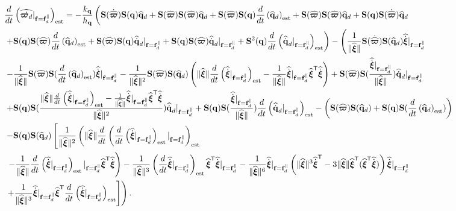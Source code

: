 \documentclass[journal,onecolumn]{IEEEtran}
\begin{document}
	\begin{align}
		&\frac{d}{dt}\LP\widehat{\dot{\bs{\varpi}_d}}|_{\f=\fd^{\|}}\RP_{\text{est}}=-\frac{k_{\dir}}{h_{\dir}}\left(\Skew{\dot{\widehat{\bs{\varpi}}}}\Skew{\dir}\qdhat+\Skew{\widehat{\bs{\varpi}}}\Skew{\widehat{\bs{\varpi}}}\qdhat+\Skew{\widehat{\bs{\varpi}}}\Skew{\dir}	\frac{d}{dt}\LP\qdhat\RP_{\text{est}}+\Skew{\widehat{\bs{\varpi}}}\Skew{\widehat{\bs{\varpi}}}\qdhat+\Skew{\dir}\Skew{\dot{\widehat{\bs{\varpi}}}}\qdhat\right.\nonumber\\
		&\left.+\Skew{\dir}\Skew{\widehat{\bs{\varpi}}}\frac{d}{dt}\LP\qdhat\RP_{\text{est}}+\Skew{\widehat{\bs{\varpi}}}\Skew{\dir}\qddothat|_{\f=\f_d^{\|}}+\Skew{\dir}\Skew{\widehat{\bs{\varpi}}}\qddothat|_{\f=\f_d^{\|}}+\Skew[2]{\dir}\frac{d}{dt}\LP\qddothat|_{\f=\f_d^{\|}}\RP_{\text{est}}\right) 
		-\left(\frac{1}{\|\widehat{\Xiq}\|}\Skew{\dot{\widehat{\bs{\varpi}}}}\Skew{\qdhat}\widehat{\dot{\Xiq}}|_{\f=\fd^{\|}}\right.\nonumber\\
		&\left.-\frac{1}{\|\widehat{\Xiq}\|}\Skew{\widehat{\bs{\varpi}}}\Skew{\frac{d}{dt}\LP\qdhat\RP_{\text{est}}}\widehat{\dot{\Xiq}}|_{\f=\fd^{\|}} - \frac{1}{\|\widehat{\Xiq}\|^2}\Skew{\widehat{\bs{\varpi}}}\Skew{\qdhat}\LP\|\widehat{\Xiq}\|\frac{d}{dt}\LP\widehat{\dot{\Xiq}}|_{\f=\fd^{\|}}\RP_{\text{est}}-\frac{1}{\|\widehat{\Xiq}\|}\widehat{\dot{\Xiq}}|_{\f=\fd^{\|}}\widehat{\Xiq}\trs\widehat{\dot{\Xiq}}\RP+\Skew{\widehat{\bs{\varpi}}}\Skew{\frac{\widehat{\dot{\Xiq}}|_{\f=\fd^{\|}}}{\|\widehat{\Xiq}\|}}\qddothat|_{\f=\f_d^{\|}}\right.\nonumber\\
		&\left.+\Skew{\dir}\Skew{\frac{\|\widehat{\Xiq}\|\frac{d}{dt}\LP\widehat{\dot{\Xiq}}|_{\f=\fd^{\|}}\RP_{\text{est}}-\frac{1}{\|\widehat{\Xiq}\|}\widehat{\dot{\Xiq}}|_{\f=\fd^{\|}}\widehat{\Xiq}\trs\widehat{\dot{\Xiq}}}{\|\widehat{\Xiq}\|^2}}\qddothat|_{\f=\f_d^{\|}}+\Skew{\dir}\Skew{\frac{\widehat{\dot{\Xiq}}|_{\f=\fd^{\|}}}{\|\widehat{\Xiq}\|}}\frac{d}{dt}\LP\qddothat|_{\f=\f_d^{\|}}\RP_{\text{est}} - \LP\Skew{\widehat{\bs{\varpi}}}\Skew{\qdhat} + \Skew{\dir}\Skew{\frac{d}{dt}\LP\qdhat\RP_{\text{est}}}\RP \right.\nonumber\\
		&\left.-\Skew{\dir}\Skew{\qdhat}\left[\frac{1}{\|\widehat{\Xiq}\|^2}\left(\|\widehat{\Xiq}\|\frac{d}{dt}\LP\frac{d}{dt}\LP\widehat{\dot{\Xiq}}|_{\f=\fd^{\|}}\RP_{\text{est}}|_{\f=\fd^{\|}}\RP_{\text{est}}\right.\right.\right.\nonumber\\
		&\left.\left.\left.-\frac{1}{\|\widehat{\Xiq}\|}\frac{d}{dt}\LP\widehat{\dot{\Xiq}}|_{\f=\fd^{\|}}\RP_{\text{est}}|_{\f=\fd^{\|}}\widehat{\Xiq}\trs\widehat{\dot{\Xiq}}\right)-\frac{1}{\|\widehat{\Xiq}\|^3}\LP\frac{d}{dt}\widehat{\dot{\Xiq}}|_{\f=\fd^{\|}}\RP_{\text{est}}\widehat{\Xiq}\trs\widehat{\dot{\Xiq}}|_{\f=\fd^{\|}}-\frac{1}{\|\widehat{\Xiq}\|^6}\widehat{\dot{\Xiq}}|_{\f=\fd^{\|}}\LP\|\widehat{\Xiq}\|^3\widehat{\dot{\Xiq}}\trs-3\|\widehat{\Xiq}\|\widehat{\Xiq}\trs(\widehat{\Xiq}\trs\widehat{\dot{\Xiq}})\RP\widehat{\dot{\Xiq}}|_{\f=\fd^{\|}}\right.\right.\nonumber\\
		&\left.\left.+\frac{1}{\|\widehat{\Xiq}\|^3}\widehat{\dot{\Xiq}}|_{\f=\fd^{\|}}\widehat{\Xiq}\trs\frac{d}{dt}\LP\widehat{\dot{\Xiq}}|_{\f=\fd^{\|}}\RP_{\text{est}}\right]\right).
	\end{align} 
\end{document}
